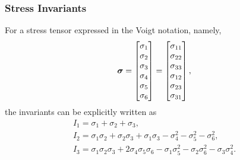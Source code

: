 \subsubsection{Stress Invariants}
For a stress tensor expressed in the Voigt notation, namely,
\begin{gather}
\bm{\sigma}=\begin{bmatrix}
\sigma_{1}\\\sigma_{2}\\\sigma_{3}\\\sigma_{4}\\\sigma_{5}\\\sigma_{6}
\end{bmatrix}=\begin{bmatrix}
\sigma_{11}\\\sigma_{22}\\\sigma_{33}\\\sigma_{12}\\\sigma_{23}\\\sigma_{31}
\end{bmatrix},
\end{gather}
the invariants can be explicitly written as
\begin{gather}
I_1=\sigma_1+\sigma_2+\sigma_3,\\
I_2=\sigma_1\sigma_2+\sigma_2\sigma_3+\sigma_1\sigma_3-\sigma_4^2-\sigma_5^2-\sigma_6^2,\\
I_3=\sigma_1\sigma_2\sigma_3+2\sigma_4\sigma_5\sigma_6-\sigma_1\sigma_5^2-\sigma_2\sigma_6^2-\sigma_3\sigma_4^2.
\end{gather}
